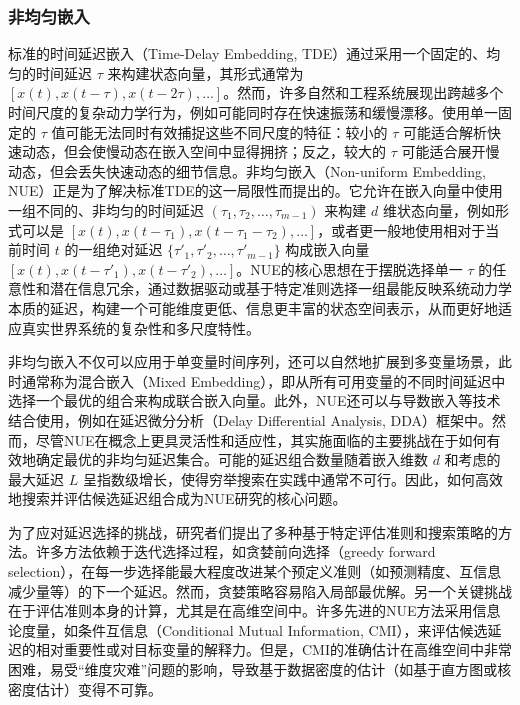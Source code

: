 \subsubsection{非均匀嵌入}
标准的时间延迟嵌入（Time-Delay Embedding, TDE）通过采用一个固定的、均匀的时间延迟 $\tau$ 来构建状态向量，其形式通常为 $[x(t), x(t-\tau), x(t-2\tau), \dots]$。然而，许多自然和工程系统展现出跨越多个时间尺度的复杂动力学行为，例如可能同时存在快速振荡和缓慢漂移。使用单一固定的 $\tau$ 值可能无法同时有效捕捉这些不同尺度的特征：较小的 $\tau$ 可能适合解析快速动态，但会使慢动态在嵌入空间中显得拥挤；反之，较大的 $\tau$ 可能适合展开慢动态，但会丢失快速动态的细节信息。非均匀嵌入（Non-uniform Embedding, NUE）正是为了解决标准TDE的这一局限性而提出的。它允许在嵌入向量中使用一组不同的、非均匀的时间延迟 $(\tau_1, \tau_2, \dots, \tau_{m-1})$ 来构建 $d$ 维状态向量，例如形式可以是 $[x(t), x(t-\tau_1), x(t-\tau_1-\tau_2), \dots]$，或者更一般地使用相对于当前时间 $t$ 的一组绝对延迟 $\{\tau'_1, \tau'_2, \dots, \tau'_{m-1}\}$ 构成嵌入向量 $[x(t), x(t-\tau'_1), x(t-\tau'_2), \dots]$。NUE的核心思想在于摆脱选择单一 $\tau$ 的任意性和潜在信息冗余，通过数据驱动或基于特定准则选择一组最能反映系统动力学本质的延迟，构建一个可能维度更低、信息更丰富的状态空间表示，从而更好地适应真实世界系统的复杂性和多尺度特性。

非均匀嵌入不仅可以应用于单变量时间序列，还可以自然地扩展到多变量场景，此时通常称为混合嵌入（Mixed Embedding），即从所有可用变量的不同时间延迟中选择一个最优的组合来构成联合嵌入向量。此外，NUE还可以与导数嵌入等技术结合使用，例如在延迟微分分析（Delay Differential Analysis, DDA）框架中。然而，尽管NUE在概念上更具灵活性和适应性，其实施面临的主要挑战在于如何有效地确定最优的非均匀延迟集合。可能的延迟组合数量随着嵌入维数 $d$ 和考虑的最大延迟 $L$ 呈指数级增长，使得穷举搜索在实践中通常不可行。因此，如何高效地搜索并评估候选延迟组合成为NUE研究的核心问题。

为了应对延迟选择的挑战，研究者们提出了多种基于特定评估准则和搜索策略的方法。许多方法依赖于迭代选择过程，如贪婪前向选择（greedy forward selection），在每一步选择能最大程度改进某个预定义准则（如预测精度、互信息减少量等）的下一个延迟。然而，贪婪策略容易陷入局部最优解。另一个关键挑战在于评估准则本身的计算，尤其是在高维空间中。许多先进的NUE方法采用信息论度量，如条件互信息（Conditional Mutual Information, CMI），来评估候选延迟的相对重要性或对目标变量的解释力。但是，CMI的准确估计在高维空间中非常困难，易受“维度灾难”问题的影响，导致基于数据密度的估计（如基于直方图或核密度估计）变得不可靠。

